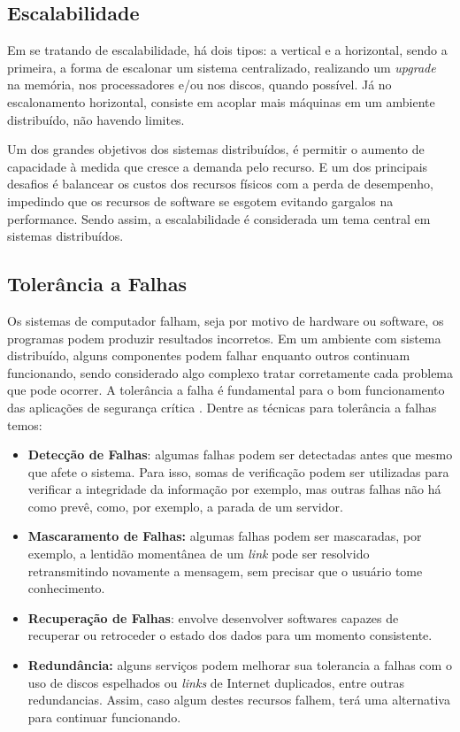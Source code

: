 \documentclass[
	12pt,				%
	oneside,			%
	a4paper,			%
	english,			%
	brazil				%
	]{abntex2ppgsi}
\begin{document}
\subsection{Escalabilidade}

Em se tratando de escalabilidade, há dois tipos: a vertical e a horizontal, sendo a primeira, a forma de escalonar um sistema centralizado, realizando um \textit{upgrade} na memória, nos processadores e/ou nos discos, quando possível. Já no escalonamento horizontal, consiste em acoplar mais máquinas em um ambiente distribuído, não havendo limites.

Um dos grandes objetivos dos sistemas distribuídos, é permitir o aumento de capacidade à medida que cresce a demanda pelo recurso. E um dos principais desafios é balancear os custos dos recursos físicos com a perda de desempenho, impedindo que os recursos de software se esgotem evitando gargalos na performance. Sendo assim, a escalabilidade é considerada um tema central em sistemas distribuídos.

\subsection{Tolerância a Falhas}

Os sistemas de computador falham, seja por motivo de hardware ou software, os programas podem produzir resultados incorretos. Em um ambiente com sistema distribuído, alguns componentes podem falhar enquanto outros continuam funcionando, sendo considerado algo complexo tratar corretamente cada problema que pode ocorrer. A tolerância a falha é fundamental para o bom funcionamento das aplicações de segurança crítica \cite{gorender2002modelo} . Dentre as técnicas para tolerância a falhas temos: 

\begin{itemize}
	\item{\textbf{Detecção de Falhas}: algumas falhas podem ser detectadas antes que mesmo que afete o sistema. Para isso, somas de verificação podem ser utilizadas para verificar a integridade da informação por exemplo, mas outras falhas não há como prevê, como, por exemplo, a parada de um servidor.} 	
	\item{\textbf{Mascaramento de Falhas: } algumas falhas podem ser mascaradas, por exemplo, a lentidão momentânea de um \textit{link} pode ser resolvido retransmitindo novamente a mensagem, sem precisar que o usuário tome conhecimento.}
	\item{\textbf{Recuperação de Falhas}: envolve desenvolver softwares capazes de recuperar ou retroceder o estado dos dados para um momento consistente.}
	\item{\textbf{Redundância:} alguns serviços podem melhorar sua tolerancia a falhas com o uso de discos espelhados ou \textit{links} de Internet duplicados, entre outras redundancias. Assim, caso algum destes recursos falhem, terá uma alternativa para continuar funcionando.}
\end{itemize} 
\end{document}
